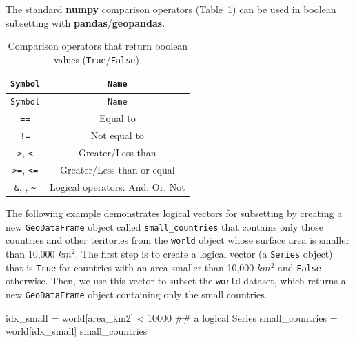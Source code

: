 \documentclass[
  letterpaper,
]{krantz}
\newenvironment{Shaded}{\begin{snugshade}}{\end{snugshade}}
\newcommand{\CommentTok}[1]{\textcolor[rgb]{0.37,0.37,0.37}{#1}}
\newcommand{\DecValTok}[1]{\textcolor[rgb]{0.68,0.00,0.00}{#1}}
\newcommand{\NormalTok}[1]{\textcolor[rgb]{0.00,0.23,0.31}{#1}}
\newcommand{\OperatorTok}[1]{\textcolor[rgb]{0.37,0.37,0.37}{#1}}
\newcommand{\StringTok}[1]{\textcolor[rgb]{0.13,0.47,0.30}{#1}}
\begin{document}
The standard \textbf{numpy} comparison operators
(Table~\ref{tbl-comparison-operators}) can be used in boolean subsetting
with \textbf{pandas}/\textbf{geopandas}.

\begin{longtable}[]{@{}cc@{}}
\caption{Comparison operators that return boolean values
(\texttt{True}/\texttt{False}).}\label{tbl-comparison-operators}\tabularnewline
\toprule\noalign{}
\texttt{Symbol} & \texttt{Name} \\
\midrule\noalign{}
\endfirsthead
\toprule\noalign{}
\texttt{Symbol} & \texttt{Name} \\
\midrule\noalign{}
\endhead
\bottomrule\noalign{}
\endlastfoot
\texttt{==} & Equal to \\
\texttt{!=} & Not equal to \\
\texttt{\textgreater{}}, \texttt{\textless{}} & Greater/Less than \\
\texttt{\textgreater{}=}, \texttt{\textless{}=} & Greater/Less than or
equal \\
\texttt{\&}, \texttt{\textbar{}}, \texttt{\textasciitilde{}} & Logical
operators: And, Or, Not \\
\end{longtable}

The following example demonstrates logical vectors for subsetting by
creating a new \texttt{GeoDataFrame} object called
\texttt{small\_countries} that contains only those countries and other
teritories from the \texttt{world} object whose surface area is smaller
than 10,000 \(km^2\). The first step is to create a logical vector (a
\texttt{Series} object) that is \texttt{True} for countries with an area
smaller than 10,000 \(km^2\) and \texttt{False} otherwise. Then, we use
this vector to subset the \texttt{world} dataset, which returns a new
\texttt{GeoDataFrame} object containing only the small countries.

\begin{Shaded}
\begin{Highlighting}[]
\NormalTok{idx\_small }\OperatorTok{=}\NormalTok{ world[}\StringTok{\textquotesingle{}area\_km2\textquotesingle{}}\NormalTok{] }\OperatorTok{\textless{}} \DecValTok{10000}  \CommentTok{\#\# a logical \textquotesingle{}Series\textquotesingle{}}
\NormalTok{small\_countries }\OperatorTok{=}\NormalTok{ world[idx\_small]}
\NormalTok{small\_countries}
\end{Highlighting}
\end{Shaded}
\end{document}
